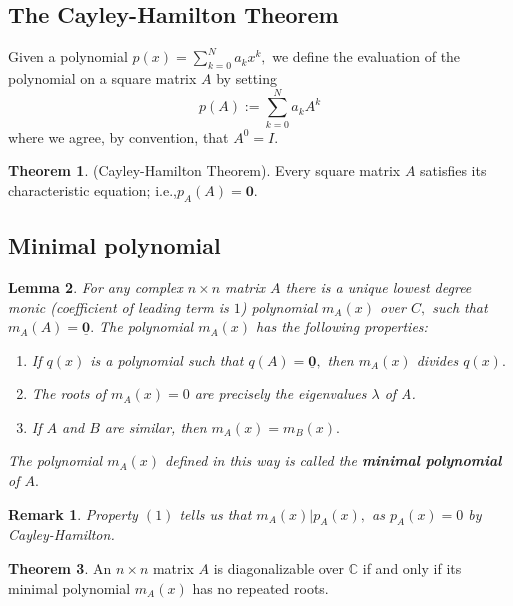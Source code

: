 \documentclass[12pt, a4paper]{article}
\newcommand{\bb}[1]{\mathbb{#1}}
\newtheorem*{remark}{Remark}
\theoremstyle{definition}
\newtheorem{theorem}{Theorem}[section]
\theoremstyle{plain}
\newtheorem{lemma}[theorem]{Lemma}
\begin{document}
\subsection{The Cayley-Hamilton Theorem}

Given a polynomial $p(x) = \sum_{k=0}^{N} a_kx^k,$ we define the evaluation of the polynomial on a square matrix $A$ by setting $$p(A):=\sum_{k=0}^{N}a_kA^k $$ where we agree, by convention, that $A^0=I.$

\begin{theorem}
(Cayley-Hamilton Theorem). Every square matrix $A$ satisfies its characteristic equation; i.e.,$p_A(A) = \mathbf{0}.$
\end{theorem}

\subsection{Minimal polynomial}

\begin{lemma}
For any complex $n \times n$ matrix $A$ there is a unique lowest degree monic (coefficient of leading term is $1$) polynomial $m_A(x)$ over $C,$ such that $m_A(A) = \underline{\mathbf{0}}.$ The polynomial $m_A(x)$ has the following properties:
\begin{enumerate}
	
	\item If $q(x)$ is a polynomial such that $q(A) = \underline{\mathbf{0}},$ then $m_A(x)$ divides $q(x).$

	\item The roots of $m_A(x) = 0$ are precisely the eigenvalues $\lambda$ of A.

	\item If $A$ and $B$ are similar, then $m_A(x) = m_B(x).$

\end{enumerate}

The polynomial $m_A(x)$ defined in this way is called the \textbf{minimal polynomial} of $A.$
\end{lemma}

\begin{remark}
Property $(1)$ tells us that $m_A(x) | p_A(x),$ as $p_A(x)=0$ by Cayley-Hamilton.
\end{remark}

\begin{theorem}
An $n\times n$ matrix $A$ is diagonalizable over $\bb{C}$ if and only if its minimal polynomial $m_A(x)$ has no repeated roots.
\end{theorem}
\end{document}
